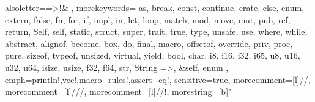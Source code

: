 {
  alsoletter={=>!&-},
  morekeywords={
          as, break, const, continue, crate, else, enum, extern, false, fn, for,
          if, impl, in, let, loop, match, mod, move, mut, pub, ref, return,
          Self, self, static, struct, super, trait, true, type, unsafe, use,
          where, while,
          abstract, alignof, become, box, do, final, macro, offsetof, override,
          priv, proc, pure, sizeof, typeof, unsized, virtual, yield,
          bool, char, i8, i16, i32, i65, u8, u16, u32, u64, isize, usize, f32,
          f64, str, String
          =>, &self, enum
  },
  emph={println!,vec!,macro_rules!,assert_eq!},
  sensitive=true, %
  morecomment=[l]{//}, %
  morecomment=[l]{///}, %
  morecomment=[l]{//!}, %
  morestring=[b]" %
}

